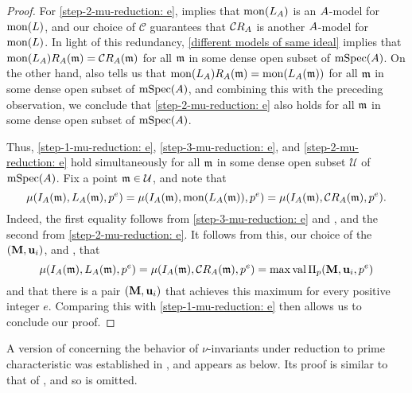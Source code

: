 \documentclass{article}
\begin{document}
\begin{proof}
For \eqref{step-2-mu-reduction: e},   implies that $\operatorname{mon}(L_A)$ is an $A$-model for $\operatorname{mon}(L)$, and our choice of $\mathcal{C}$ guarantees that $\mathcal{C} R_A$ is another $A$-model for $\operatorname{mon}(L)$.  In light of this redundancy, \ref{different models of same ideal} implies that $\operatorname{mon}(L_A) R_A(\mathfrak{m}) = \mathcal{C} R_A(\mathfrak{m})$ for all $\mathfrak{m}$ in some dense open subset of $\operatorname{mSpec}(A)$.  On the other hand,  also tells us that $\operatorname{mon}(L_A) R_A(\mathfrak{m}) = \operatorname{mon}(L_A(\mathfrak{m}))$ for all $\mathfrak{m}$ in some dense open subset of $\operatorname{mSpec}(A)$, and combining this with the preceding observation, we conclude that \eqref{step-2-mu-reduction: e} also holds for all $\mathfrak{m}$ in some dense open subset of $\operatorname{mSpec}(A)$.  

Thus, \eqref{step-1-mu-reduction: e}, \eqref{step-3-mu-reduction: e}, and \eqref{step-2-mu-reduction: e} hold simultaneously for all $\mathfrak{m}$ in some dense open subset $\mathcal{U}$ of $\operatorname{mSpec}(A)$.  Fix a point $\mathfrak{m} \in \mathcal{U}$, and note that
%
\[ \mu(I_A(\mathfrak{m}), L_A(\mathfrak{m}), p^e) = \mu(I_A(\mathfrak{m}), \operatorname{mon}(L_A(\mathfrak{m})), p^e) = \mu(I_A(\mathfrak{m}), \mathcal{C} R_A(\mathfrak{m}), p^e).\]
Indeed, the first equality follows from \eqref{step-3-mu-reduction: e} and , and the second from \eqref{step-2-mu-reduction: e}.  It follows from this,  our choice of the $(\mathbf{M}, \mathbf{u}_i)$, and , that 
%
\[ \mu(I_A(\mathfrak{m}), L_A(\mathfrak{m}), p^e) = \mu(I_A(\mathfrak{m}), \mathcal{C} R_A(\mathfrak{m}), p^e)  =  \max \operatorname{val} \Pi_p(\mathbf{M}, \mathbf{u}_i, p^e) \]
%
and that there is a pair $(\mathbf{M}, \mathbf{u}_i)$ that achieves this maximum for every positive integer $e$.  Comparing this with \eqref{step-1-mu-reduction: e}
 then allows us to conclude our proof.
\end{proof}

A version of  concerning the behavior of $\nu$-invariants  under reduction to prime characteristic was established in \cite[Section~4]{budur+mustata+saito.roots_bs_polys_monomial}, and appears as  below.  Its proof is similar to that of , and so is omitted.    
\end{document}
